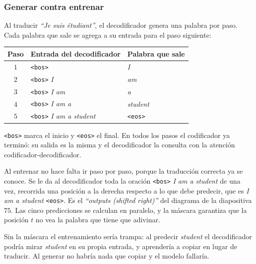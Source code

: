 \documentclass[11pt,letterpaper]{article}
\begin{document}
\subsubsection*{Generar contra entrenar}

Al traducir \textit{``Je suis étudiant''}, el decodificador genera una
palabra por paso. Cada palabra que sale se agrega a su entrada para el
paso siguiente:

\begin{center}
\begin{tabular}{cll}
    \toprule
    \textbf{Paso} & \textbf{Entrada del decodificador}
    & \textbf{Palabra que sale} \\
    \midrule
    $1$ & \texttt{<bos>} & \textit{I} \\
    $2$ & \texttt{<bos>} \textit{I} & \textit{am} \\
    $3$ & \texttt{<bos>} \textit{I am} & \textit{a} \\
    $4$ & \texttt{<bos>} \textit{I am a} & \textit{student} \\
    $5$ & \texttt{<bos>} \textit{I am a student} & \texttt{<eos>} \\
    \bottomrule
\end{tabular}
\end{center}

\texttt{<bos>} marca el inicio y \texttt{<eos>} el final. En todos los
pasos el codificador ya terminó: su salida es la misma y el
decodificador la consulta con la atención codificador-decodificador.

Al entrenar no hace falta ir paso por paso, porque la traducción
correcta ya se conoce. Se le da al decodificador toda la oración
\texttt{<bos>} \textit{I am a student} de una vez, recorrida una
posición a la derecha respecto a lo que debe predecir, que es
\textit{I am a student} \texttt{<eos>}. Es el \textit{``outputs
(shifted right)''} del diagrama de la diapositiva $75$. Las cinco
predicciones se calculan en paralelo, y la máscara garantiza que la
posición $t$ no vea la palabra que tiene que adivinar.

\begin{ojo}
    Sin la máscara el entrenamiento sería trampa: al predecir
    \textit{student} el decodificador podría mirar \textit{student} en
    su propia entrada, y aprendería a copiar en lugar de traducir.
    Al generar no habría nada que copiar y el modelo fallaría.
\end{ojo}

\end{document}
